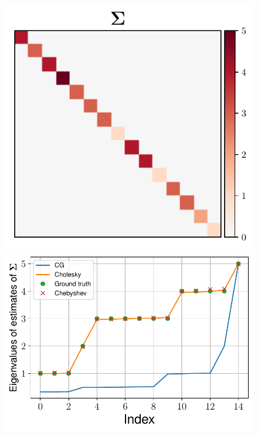 \documentclass[nohypdvips,onefignum,onetabnum]{siamart171218}
\begin{document}
\begin{figure}
  \centering
  \mbox{{\includegraphics[scale=0.5]{images/simu1_ex2_A.pdf}}}
  \mbox{{\includegraphics[scale=0.4]{images/simu1_ex2_eigvals_A.pdf}}}

\end{figure}
\end{document}
